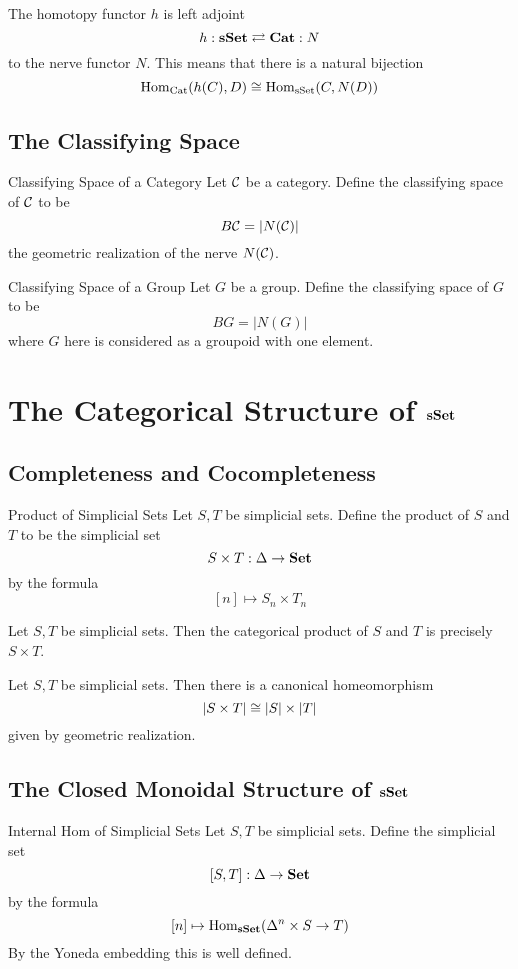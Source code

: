 \documentclass[a4paper]{article}
\begin{document}
\begin{thm}{}{} The homotopy functor $h$ is left adjoint $$h:\bold{sSet}\rightleftarrows\bold{Cat}:N$$ to the nerve functor $N$. This means that there is a natural bijection $$\operatorname{Hom}_\text{Cat}(h(C),D)\cong\operatorname{Hom}_\text{sSet}(C,N(D))$$
\end{thm}

\subsection{The Classifying Space}
\begin{defn}{Classifying Space of a Category}{} Let $\mathcal{C}$ be a category. Define the classifying space of $\mathcal{C}$ to be $$B\mathcal{C}=|N(\mathcal{C})|$$ the geometric realization of the nerve $N(\mathcal{C})$. 
\end{defn}

\begin{defn}{Classifying Space of a Group}{} Let $G$ be a group. Define the classifying space of $G$ to be $$BG=|N(G)|$$ where $G$ here is considered as a groupoid with one element. 
\end{defn}

\pagebreak
\section{The Categorical Structure of $\bold{sSet}$}
\subsection{Completeness and Cocompleteness}
\begin{defn}{Product of Simplicial Sets}{} Let $S,T$ be simplicial sets. Define the product of $S$ and $T$ to be the simplicial set $$S\times T:\Delta\to\bold{Set}$$ by the formula $$[n]\mapsto S_n\times T_n$$
\end{defn}

\begin{prp}{}{} Let $S,T$ be simplicial sets. Then the categorical product of $S$ and $T$ is precisely $S\times T$. 
\end{prp}

\begin{lmm}{}{} Let $S,T$ be simplicial sets. Then there is a canonical homeomorphism $$\abs{S\times T}\cong\abs{S}\times\abs{T}$$ given by geometric realization. 
\end{lmm}

\subsection{The Closed Monoidal Structure of $\bold{sSet}$}
\begin{defn}{Internal Hom of Simplicial Sets}{} Let $S,T$ be simplicial sets. Define the simplicial set $$[S,T]:\Delta\to\bold{Set}$$ by the formula $$[n]\mapsto\operatorname{Hom}_\bold{sSet}(\Delta^n\times S\to T)$$ By the Yoneda embedding this is well defined. 
\end{defn}
\end{document}
